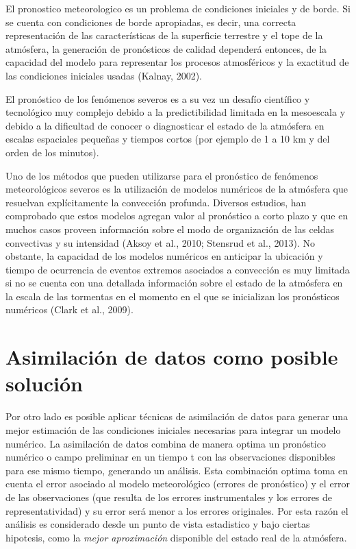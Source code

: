 \documentclass[12pt,twoside]{reedthesis}
\begin{document}
El pronostico meteorologico es un problema de condiciones iniciales y de borde. Si se cuenta con condiciones de borde apropiadas, es decir, una correcta representación de las características de la superficie terrestre y el tope de la atmósfera, la generación de pronósticos de calidad dependerá entonces, de la capacidad del modelo para representar los procesos atmosféricos y la exactitud de las condiciones iniciales usadas (Kalnay, 2002).

El pronóstico de los fenómenos severos es a su vez un desafío científico y tecnológico muy complejo debido a la predictibilidad limitada en la mesoescala y debido a la dificultad de conocer o diagnosticar el estado de la atmósfera en escalas espaciales pequeñas y tiempos cortos (por ejemplo de 1 a 10 km y del orden de los minutos).

Uno de los métodos que pueden utilizarse para el pronóstico de fenómenos meteorológicos severos es la utilización de modelos numéricos de la atmósfera que resuelvan explícitamente la convección profunda. Diversos estudios, han comprobado que estos modelos agregan valor al pronóstico a corto plazo y que en muchos casos proveen información sobre el modo de organización de las celdas convectivas y su intensidad (Aksoy et al., 2010; Stensrud et al., 2013). No obstante, la capacidad de los modelos numéricos en anticipar la ubicación y tiempo de ocurrencia de eventos extremos asociados a convección es muy limitada si no se cuenta con una detallada información sobre el estado de la atmósfera en la escala de las tormentas en el momento en el que se inicializan los pronósticos numéricos (Clark et al., 2009).

\hypertarget{asimilaciuxf3n-de-datos-como-posible-soluciuxf3n}{%
\section{Asimilación de datos como posible solución}\label{asimilaciuxf3n-de-datos-como-posible-soluciuxf3n}}

Por otro lado es posible aplicar técnicas de asimilación de datos para generar una mejor estimación de las condiciones iniciales necesarias para integrar un modelo numérico. La asimilación de datos combina de manera optima un pronóstico numérico o campo preliminar en un tiempo t con las observaciones disponibles para ese mismo tiempo, generando un análisis. Esta combinación optima toma en cuenta el error asociado al modelo meteorológico (errores de pronóstico) y el error de las observaciones (que resulta de los errores instrumentales y los errores de representatividad) y su error será menor a los errores originales. Por esta razón el análisis es considerado desde un punto de vista estadistico y bajo ciertas hipotesis, como la \emph{mejor aproximación} disponible del estado real de la atmósfera.
\end{document}
